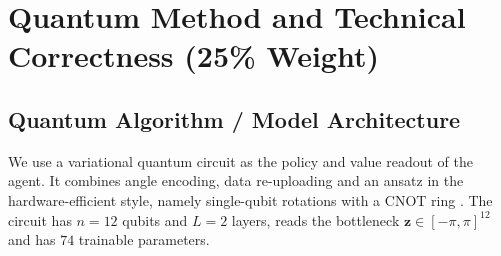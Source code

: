\documentclass[10pt, a4paper]{article}
\begin{document}
\section{Quantum Method and Technical Correctness (25\% Weight)}
\label{sec:quantum_method}

\subsection{Quantum Algorithm / Model Architecture}

We use a variational quantum circuit as the policy and value readout of the agent. It combines angle encoding, data re-uploading \cite{perez_salinas_reuploading_2020} and an ansatz in the hardware-efficient style, namely single-qubit rotations with a CNOT ring \cite{kandala_hea_2017}. The circuit has $n=12$ qubits and $L=2$ layers, reads the bottleneck $\mathbf{z}\in[-\pi,\pi]^{12}$ and has $74$ trainable parameters.
\end{document}
